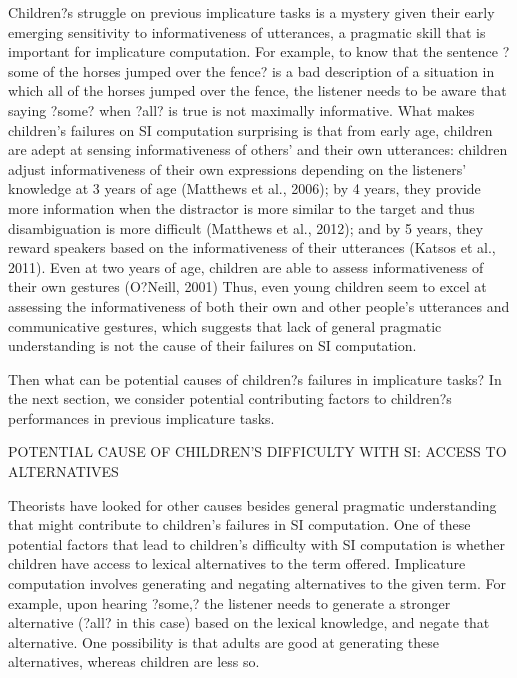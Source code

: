 Children?s struggle on previous implicature tasks is a mystery given their early emerging sensitivity to informativeness of utterances, a pragmatic skill that is important for implicature computation. For example, to know that the sentence ?some of the horses jumped over the fence? is a bad description of a situation in which all of the horses jumped over the fence, the listener needs to be aware that saying ?some? when ?all? is true is not maximally informative. What makes children's failures on SI computation surprising is that from early age, children are adept at sensing informativeness of others' and their own utterances: children adjust informativeness of their own expressions depending on the listeners' knowledge at 3 years of age (Matthews et al., 2006); by 4 years, they provide more information when the distractor is more similar to the target and thus disambiguation is more difficult (Matthews et al., 2012); and by 5 years, they reward speakers based on the informativeness of their utterances (Katsos et al., 2011). Even at two years of age, children are able to assess informativeness of their own gestures (O?Neill, 2001) Thus, even young children seem to excel at assessing the informativeness of both their own and other people's utterances and communicative gestures, which suggests that lack of general pragmatic understanding is not the cause of their failures on SI computation. 

Then what can be potential causes of children?s failures in implicature tasks? In the next section, we consider potential contributing factors to children?s performances in previous implicature tasks. 

POTENTIAL CAUSE OF CHILDREN'S DIFFICULTY WITH SI: ACCESS TO ALTERNATIVES

Theorists have looked for other causes besides general pragmatic understanding that might contribute to children's failures in SI computation. One of these potential factors that lead to children's difficulty with SI computation is whether children have access to lexical alternatives to the term offered. Implicature computation involves generating and negating alternatives to the given term. For example, upon hearing ?some,? the listener needs to generate a stronger alternative (?all? in this case) based on the lexical knowledge, and negate that alternative. One possibility is that adults are good at generating these alternatives, whereas children are less so.

